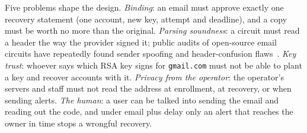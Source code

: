 Five problems shape the design. \emph{Binding}: an email must approve exactly
one recovery statement (one account, new key, attempt and deadline), and a
copy must be worth no more than the original. \emph{Parsing soundness}: a
circuit must read a header the way the provider signed it; public audits of
open-source email circuits have repeatedly found sender spoofing and
header-confusion
flaws~\cite{audit-zksecurity-2024,audit-yacademy,audit-veridise-2024,audit-consensys-2024,audit-matterlabs-2024,audit-zellic-2024}.
\emph{Key trust}: whoever says which RSA key signs for \texttt{gmail.com}
must not be able to plant a key and recover accounts with it. \emph{Privacy
from the operator}: the operator's servers and staff must not read the
address at enrollment, at recovery, or when sending alerts. \emph{The
human}: a user can be talked into sending the email and reading out the
code, and under email plus delay only an alert that reaches the owner in
time stops a wrongful recovery.

